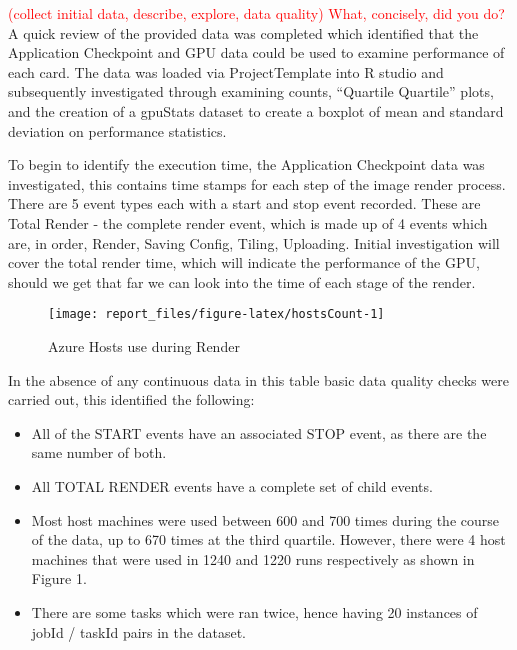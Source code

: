 \documentclass[
  twocolumn]{article}
\providecommand{\tightlist}{%
  \setlength{\itemsep}{0pt}\setlength{\parskip}{0pt}}
\begin{document}
\textcolor{red}{(collect initial data, describe, explore, data quality)}
\textcolor{red}{What, concisely, did you do?} A quick review of the
provided data was completed which identified that the Application
Checkpoint and GPU data could be used to examine performance of each
card. The data was loaded via ProjectTemplate into R studio and
subsequently investigated through examining counts, ``Quartile
Quartile'' plots, and the creation of a gpuStats dataset to create a
boxplot of mean and standard deviation on performance statistics.

To begin to identify the execution time, the Application Checkpoint data
was investigated, this contains time stamps for each step of the image
render process. There are 5 event types each with a start and stop event
recorded. These are Total Render - the complete render event, which is
made up of 4 events which are, in order, Render, Saving Config, Tiling,
Uploading. Initial investigation will cover the total render time, which
will indicate the performance of the GPU, should we get that far we can
look into the time of each stage of the render.

\begin{figure}
\texttt{[image: report\_files/figure-latex/hostsCount-1]} \caption{Azure Hosts use during Render}\label{fig:hostsCount}
\end{figure}

In the absence of any continuous data in this table basic data quality
checks were carried out, this identified the following:

\begin{itemize}
\tightlist
\item
  All of the START events have an associated STOP event, as there are
  the same number of both.
\item
  All TOTAL RENDER events have a complete set of child events.
\item
  Most host machines were used between 600 and 700 times during the
  course of the data, up to 670 times at the third quartile. However,
  there were 4 host machines that were used in 1240 and 1220 runs
  respectively as shown in Figure 1.
\item
  There are some tasks which were ran twice, hence having 20 instances
  of jobId / taskId pairs in the dataset.
\end{itemize}
\end{document}
